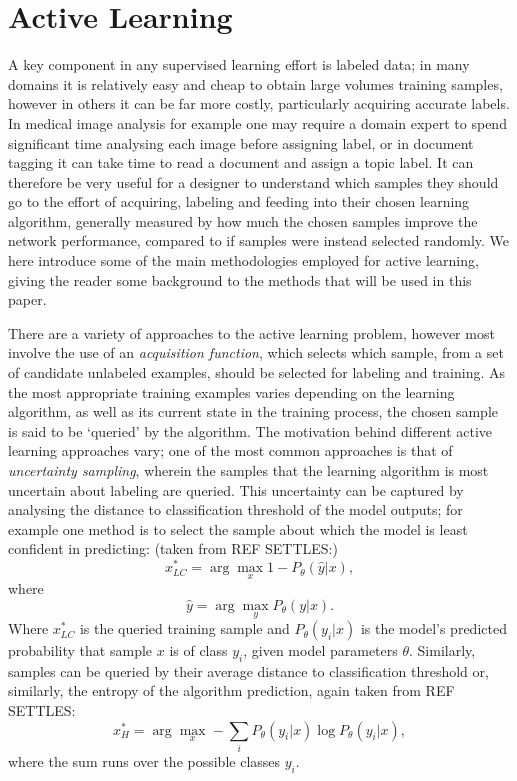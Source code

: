 \section{Active Learning}\label{Background_ActiveLearning}
A key component in any supervised learning effort is labeled data; in many domains it is relatively easy and cheap to obtain large volumes training samples, however in others it can be far more costly, particularly acquiring accurate labels. In medical image analysis for example one may require a domain expert to spend significant time analysing each image before assigning label, or in document tagging it can take time to read a document and assign a topic label. It can therefore be very useful for a designer to understand which samples they should go to the effort of acquiring, labeling and feeding into their chosen learning algorithm, generally measured by how much the chosen samples improve the network performance, compared to if samples were instead selected randomly. We here introduce some of the main methodologies employed for active learning, giving the reader some background to the methods that will be used in this paper.

There are a variety of approaches to the active learning problem, however most involve the use of an \textit{acquisition function}, which selects which sample, from a set of candidate unlabeled examples, should be selected for labeling and training. As the most appropriate training examples varies depending on the learning algorithm, as well as its current state in the training process, the chosen sample is said to be `queried' by the algorithm. The motivation behind different active learning approaches vary; one of the most common approaches is that of \textit{uncertainty sampling}, wherein the samples that the learning algorithm is most uncertain about labeling are queried. This uncertainty can be captured by analysing the distance to classification threshold of the model outputs; for example one method is to select the sample about which the model is least confident in predicting: (taken from REF SETTLES:)
\begin{equation}
x^{*}_{LC} = \arg\max_{x} 1 - P_{\theta}(\hat{y}|x),
\end{equation}
where
\begin{equation}
\hat{y} = \arg\max_{y}P_{\theta}(y|x).
\end{equation}
Where $x^{*}_{LC}$ is the queried training sample and $P_{\theta}(y_{i}|x)$ is the model's predicted probability that sample $x$ is of class $y_{i}$, given model parameters $\theta$. Similarly, samples can be queried by their average distance to classification threshold or, similarly, the entropy of the algorithm prediction, again taken from REF SETTLES:
\begin{equation}
x^{*}_{H} = \arg\max_{x} - \sum_{i} P_{\theta}(y_i|x)\log P_{\theta}(y_i|x),
\end{equation}
where the sum runs over the possible classes $y_i$.

